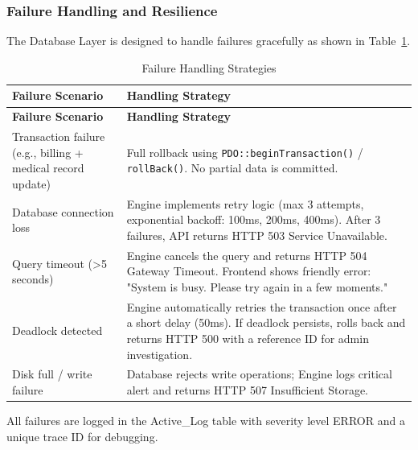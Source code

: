 \subsubsection{Failure Handling and Resilience}
The Database Layer is designed to handle failures gracefully as shown in Table~\ref{tab:failure-handling}.
\begin{longtable}{%
		p{} 
		p{}}
	
	\caption{Failure Handling Strategies}
	\label{tab:failure-handling} \\
	
	\toprule
	\textbf{Failure Scenario} & \textbf{Handling Strategy} \\
	\midrule
	\endfirsthead
	
	\toprule
	\textbf{Failure Scenario} & \textbf{Handling Strategy} \\
	\midrule
	\endhead
	
	Transaction failure (e.g., billing + medical record update) & Full rollback using \texttt{PDO::beginTransaction()} / \texttt{rollBack()}. No partial data is committed. \\[6pt]
	
	Database connection loss & Engine implements retry logic (max 3 attempts, exponential backoff: 100ms, 200ms, 400ms). After 3 failures, API returns HTTP 503 Service Unavailable. \\[6pt]
	
	Query timeout (>5 seconds) & Engine cancels the query and returns HTTP 504 Gateway Timeout. Frontend shows friendly error: "System is busy. Please try again in a few moments." \\[6pt]
	
	Deadlock detected & Engine automatically retries the transaction once after a short delay (50ms). If deadlock persists, rolls back and returns HTTP 500 with a reference ID for admin investigation. \\[6pt]
	
	Disk full / write failure & Database rejects write operations; Engine logs critical alert and returns HTTP 507 Insufficient Storage. \\
	
	\bottomrule
\end{longtable}
All failures are logged in the Active\_Log table with severity level ERROR and a unique trace ID for debugging.
